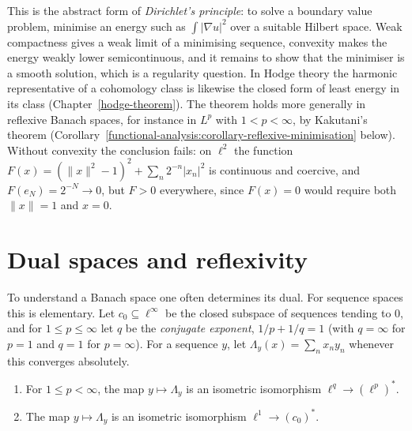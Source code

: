 This is the abstract form of \emph{Dirichlet's principle}: to solve a boundary value problem, minimise an energy such as $\int|\nabla u|^2$ over a suitable Hilbert space. Weak compactness gives a weak
limit of a minimising sequence, convexity makes the energy weakly lower semicontinuous, and it remains to show that the minimiser is a smooth solution, which is a regularity question. In Hodge
theory the harmonic representative of a cohomology class is likewise the closed form of least energy in its class (Chapter~\ref{hodge-theorem}). The theorem holds more generally in reflexive Banach spaces, for instance in $L^p$ with $1 < p < \infty$, by Kakutani's theorem
(Corollary~\ref{functional-analysis:corollary-reflexive-minimisation} below). Without convexity the conclusion fails: on $\ell^2$ the function $F(x) = (\|x\|^2 - 1)^2 + \sum_n2^{-n}|x_n|^2$ is continuous and coercive, and
$F(e_N) = 2^{-N} \to 0$, but $F > 0$ everywhere, since $F(x) = 0$ would require both $\|x\| = 1$ and $x = 0$.

\section{Dual spaces and reflexivity}\label{functional-analysis:section-duality}

To understand a Banach space one often determines its dual. For sequence spaces this is elementary. Let $c_0 \subseteq \ell^\infty$ be the closed subspace of sequences tending to $0$, and for $1 \leq p \leq \infty$ let
$q$ be the \emph{conjugate exponent}, $1/p + 1/q = 1$ (with $q = \infty$ for $p = 1$ and $q = 1$ for $p = \infty$). For a sequence $y$, let $\Lambda_y(x) = \sum_nx_ny_n$ whenever this converges absolutely.

\begin{proposition}\label{functional-analysis:proposition-sequence-duals}
\begin{enumerate}
\item For $1 \leq p < \infty$, the map $y \mapsto \Lambda_y$ is an isometric isomorphism $\ell^q \to (\ell^p)^*$.
\item The map $y \mapsto \Lambda_y$ is an isometric isomorphism $\ell^1 \to (c_0)^*$.
\end{enumerate}
\end{proposition}

